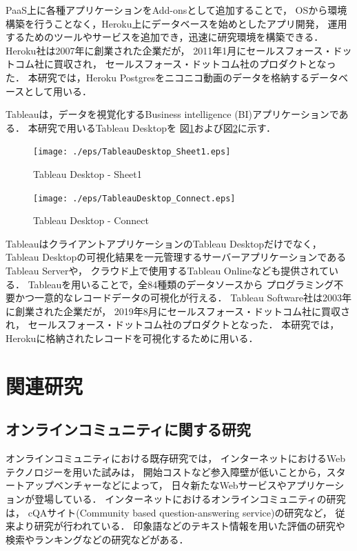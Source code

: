 \documentclass[submit,techrep,noauthor]{ipsj}
\begin{document}
\newpage
PaaS上に各種アプリケーションをAdd-onsとして追加することで，
OSから環境構築を行うことなく，Heroku上にデータベースを始めとしたアプリ開発，
運用するためのツールやサービスを追加でき，迅速に研究環境を構築できる．
%
Heroku社は2007年に創業された企業だが，
2011年1月にセールスフォース・ドットコム社に買収され，
セールスフォース・ドットコム社のプロダクトとなった．
本研究では，Heroku Postgresをニコニコ動画のデータを格納するデータベースとして用いる．

Tableauは，データを視覚化するBusiness intelligence (BI)アプリケーションである．
本研究で用いるTableau Desktopを
図\ref{fig:tableaudesktop_sheet1}および図\ref{fig:tableaudesktop_connect}に示す．

\begin{figure}[h]
  \begin{center}
    \texttt{[image: ./eps/TableauDesktop\_Sheet1.eps]}
    \caption{Tableau Desktop - Sheet1}
    \label{fig:tableaudesktop_sheet1}
  \end{center}
\end{figure}
%
\begin{figure}[h]
  \begin{center}
    \texttt{[image: ./eps/TableauDesktop\_Connect.eps]}
    \caption{Tableau Desktop - Connect}
    \label{fig:tableaudesktop_connect}
  \end{center}
\end{figure}


TableauはクライアントアプリケーションのTableau Desktopだけでなく，
Tableau Desktopの可視化結果を一元管理するサーバーアプリケーションであるTableau Serverや，
クラウド上で使用するTableau Onlineなども提供されている．
%
Tableauを用いることで，全84種類のデータソースから
プログラミング不要かつ一意的なレコードデータの可視化が行える．
%
Tableau Software社は2003年に創業された企業だが，
2019年8月にセールスフォース・ドットコム社に買収され，
セールスフォース・ドットコム社のプロダクトとなった．
本研究では，Herokuに格納されたレコードを可視化するために用いる．

\newpage
\section{関連研究}
\subsection{オンラインコミュニティに関する研究}\label{portal}
オンラインコミュニティにおける既存研究では，
インターネットにおけるWebテクノロジーを用いた試みは，
開始コストなど参入障壁が低いことから，スタートアップベンチャーなどによって，
日々新たなWebサービスやアプリケーションが登場している．
%
%
インターネットにおけるオンラインコミュニティの研究は，
cQAサイト(Community based question-answering service)の研究など，
従来より研究が行われている\cite{article_okumura}．
%
印象語などのテキスト情報を用いた評価の研究\cite{article_yokoyama}や
検索やランキング\cite{article_kure}などの研究などがある．
\end{document}
